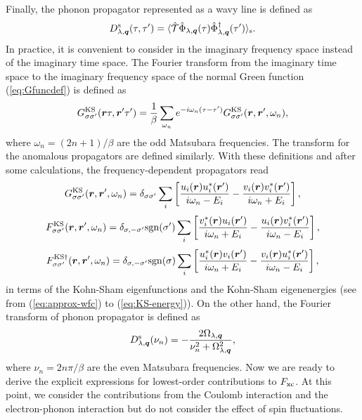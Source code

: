 %
Finally, the phonon propagator represented as a wavy line is defined as 
%
\begin{equation}
	D^{\rm s}_{\lambda,{\bm q}}(\tau,\tau') = \langle \hat{\mathcal T}
	\hat{\Phi}_{\lambda, {\bm q}}(\tau)\hat{\Phi}^\dag_{\lambda, {\bm q}}(\tau')
	\rangle_{\rm s}.
	\label{eq:ph-prop}
\end{equation}
%
In practice, it is convenient to consider in the imaginary frequency space instead of the imaginary time space.
The Fourier transform from the imaginary time space to the imaginary frequency space 
of the normal Green function (\ref{eq:Gfuncdef}) is defined as
%
\begin{equation}
	G^{\rm KS}_{\sigma\sigma'}({\bm r}\tau,{\bm r'}\tau') = \frac{1}{\beta}
	\sum_{\omega_n}e^{-i\omega_n(\tau-\tau')}G^{\rm KS}_{\sigma\sigma'}({\bm r},{\bm r'},\omega_n)
	,
	\label{eq:Fouriertrans}
\end{equation}
%
where $\omega_n=(2n+1)/\beta$ are the odd Matsubara frequencies. 
The transform for the anomalous propagators are defined similarly. 
With these definitions and after some calculations, the frequency-dependent propagators read
%
\begin{equation}
	G^{\rm KS}_{\sigma\sigma'}({\bm r},{\bm r'},\omega_n) = \delta_{\sigma\sigma'}
	\sum_{i}
	\left[
		\frac{u_i(\bm r)u^\ast_i(\bm r')}{i\omega_n-E_i} - 
		\frac{v_i(\bm r)v^\ast_i(\bm r')}{i\omega_n+E_i}
	\right],
	\label{eq:Gfreq}
\end{equation}
%
\begin{equation}
	F^{\rm KS}_{\sigma\sigma'}({\bm r},{\bm r'},\omega_n) = \delta_{\sigma,-\sigma'}{\rm sgn}(\sigma')
	\sum_{i}
	\left[
		\frac{v^\ast_i(\bm r)u_i(\bm r')}{i\omega_n+E_i} - 
		\frac{u_i(\bm r)v^\ast_i(\bm r')}{i\omega_n-E_i}
	\right],
	\label{eq:Ffreq}
\end{equation}
%
\begin{equation}
	F^{\rm KS\dag}_{\sigma\sigma'}({\bm r},{\bm r'},\omega_n) = \delta_{\sigma,-\sigma'}{\rm sgn}(\sigma)
	\sum_{i}
	\left[
		\frac{u^\ast_i(\bm r)v_i(\bm r')}{i\omega_n+E_i} - 
		\frac{v_i(\bm r)u^\ast_i(\bm r')}{i\omega_n-E_i}
	\right],
	\label{eq:Fdagfreq}
\end{equation}
%
in terms of the Kohn-Sham eigenfunctions and the Kohn-Sham eigenenergies 
(see from (\ref{eq:approx-wfc}) to (\ref{eq:KS-energy})).
On the other hand, the Fourier transform of phonon propagator is defined as
%
\begin{equation}
	D^{\rm s}_{\lambda, \bm q}(\nu_n) = - \frac{2\Omega_{\lambda, \bm q}}
	{\nu^2_n + \Omega^2_{\lambda, \bm q}},
	\label{eq:phtrans}
\end{equation}
%
where $\nu_n = 2n\pi/\beta$ are the even Matsubara frequencies.
Now we are ready to derive the explicit expressions for lowest-order contributions to $F_{\rm xc}$.
At this point, we consider the contributions from the Coulomb interaction and the electron-phonon interaction
but do not consider the effect of spin fluctuations.

